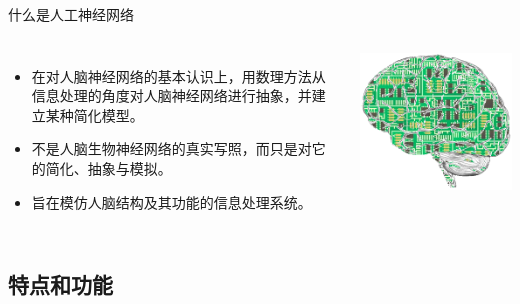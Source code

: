 \documentclass[xcolor=svgnames]{beamer}
\begin{document}
\begin{frame}{什么是人工神经网络}
  \begin{columns}
    \begin{itemize}
    \item 在对人脑神经网络的基本认识上，用数理方法从信息处理的角度对人脑神经网络进行\alert{抽象}，并建立某种\alert{简化模型}。
    \item 不是人脑生物神经网络的真实写照，而只是对它的\alert{简化、抽象与模拟}。
    \item 旨在\alert{模仿}人脑结构及其功能的信息处理系统。
    \end{itemize}
    \includegraphics[width=\textwidth]{fig16.png}
  \end{columns}
\end{frame}

\subsection{特点和功能}
\label{sec:feature}
\end{document}
